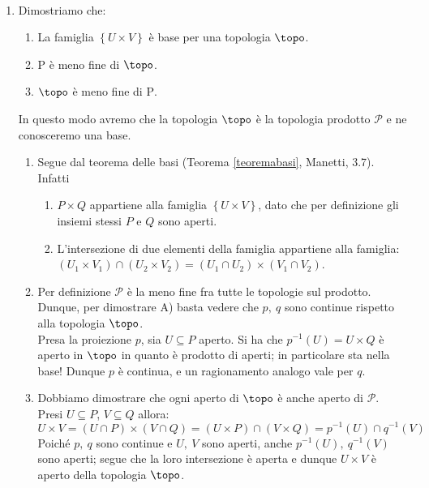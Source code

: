 \begin{demonstration}~{}
\begin{enumerate}[label=\Roman*]
\item Dimostriamo che:
\begin{enumerate}[label=(\alph*)]
\item La famiglia $\left\{U\times V\right\}$ è base per una topologia $\topo$.
\item $\mathrm{P}$ è meno fine di $\topo$.
\item $\topo$ è meno fine di $\mathrm{P}$.
\end{enumerate}
In questo modo avremo che la topologia $\topo$ è la topologia prodotto $\mathcal{P}$ e ne conosceremo una base.
\begin{enumerate}[label=(\alph*)]
\item Segue dal teorema delle basi (Teorema \ref{teoremabasi}, Manetti, 3.7). Infatti
\begin{enumerate}
\item $P\times Q$ appartiene alla famiglia $\left\{U\times V\right\}$, dato che per definizione gli insiemi stessi $P$ e $Q$ sono aperti.
\item L'intersezione di due elementi della famiglia appartiene alla famiglia:
$\left(U_1\times V_1\right)\cap\left(U_2\times V_2\right)=\left(U_1\cap U_2\right)\times \left(V_1\cap V_2\right)$.
\end{enumerate}
\item Per definizione $\mathcal{P}$ è la meno fine fra tutte le topologie sul prodotto. Dunque, per dimostrare A) basta vedere che $p,\ q$ sono continue rispetto alla topologia $\topo$.\\
Presa la proiezione $p$, sia $U\subseteq P$ aperto. Si ha che $p^{-1}\left(U\right)=U\times Q$ è aperto in $\topo$ in quanto è prodotto di aperti; in particolare sta nella base! Dunque $p$ è continua, e un ragionamento analogo vale per $q$.
\item Dobbiamo dimostrare che ogni aperto di $\topo$ è anche aperto di $\mathcal{P}$.\\
Presi $U\subseteq P$, $V\subseteq Q$ allora:
\begin{equation*}
U\times V=\left(U\cap P\right)\times\left(V\cap Q\right)=\left(U\times P\right)\cap \left(V\times Q\right)=p^{-1}\left(U\right)\cap q^{-1}\left(V\right)
\end{equation*}
Poiché $p,\ q$ sono continue e $U,\ V$ sono aperti, anche $p^{-1}\left(U\right),\ q^{-1}\left(V\right)$ sono aperti; segue che la loro intersezione è aperta e dunque $U\times V$ è aperto della topologia $\topo$.

\end{enumerate}
\end{enumerate}
\end{demonstration}
